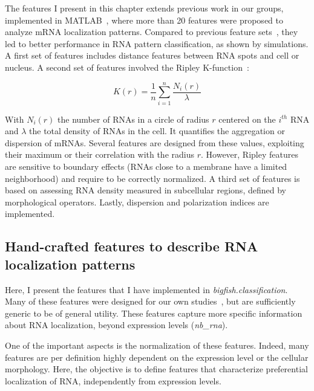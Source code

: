 The features I present in this chapter extends previous work in our groups, implemented in MATLAB~\cite{mueller_fish-quant_2013, samacoits_computational_2018}, where more than 20 features were proposed to analyze mRNA localization patterns.
Compared to previous feature sets~\cite{battich_image-based_2013}, they led to better performance in \ac{RNA} pattern classification, as shown by simulations.
A first set of features includes distance features between \ac{RNA} spots and cell or nucleus.
A second set of features involved the Ripley K-function~\cite{ripley2005spatial}:

\begin{equation}
	{\displaystyle K(r) = \frac{1}{n} \sum_{i = 1}^{n} \frac{N_i(r)}{\lambda}}
\end{equation}

\noindent
With $N_i(r)$ the number of \ac{RNA}s in a circle of radius $r$ centered on the $i^{th}$ \ac{RNA} and $\lambda$ the total density of \ac{RNA}s in the cell.
It quantifies the aggregation or dispersion of mRNAs.
Several features are designed from these values, exploiting their maximum or their correlation with the radius $r$.
However, Ripley features are sensitive to boundary effects (\ac{RNA}s close to a membrane have a limited neighborhood) and require to be correctly normalized.
A third set of features is based on assessing \ac{RNA} density measured in subcellular regions, defined by morphological operators.
Lastly, dispersion and polarization indices are implemented.

\subsection{Hand-crafted features to describe RNA localization patterns}
\label{subsec:expert_features}

Here, I present the features that I have implemented in \emph{bigfish.classification}.
Many of these features were designed for our own studies~\cite{CHOUAIB_2020,safieddine_choreography_2021,pichon_kinesin_2021}, but are sufficiently generic to be of general utility.
These features capture more specific information about \ac{RNA} localization, beyond expression levels (\emph{nb\_rna}).

One of the important aspects is the normalization of these features.
Indeed, many features are per definition highly dependent on the expression level or the cellular morphology.
Here, the objective is to define features that characterize preferential localization of \ac{RNA}, independently from expression levels.

